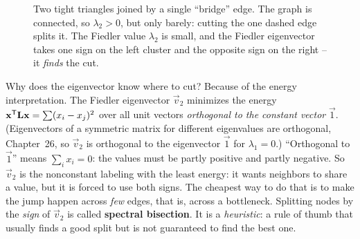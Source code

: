 \begin{figure}[H]
\centering
{}
\caption{Two tight triangles joined by a single ``bridge'' edge. The graph is connected, so
$\lambda_2 > 0$, but only barely: cutting the one dashed edge splits it. The Fiedler value
$\lambda_2$ is small, and the Fiedler eigenvector takes one sign on the left cluster and the
opposite sign on the right -- it \emph{finds} the cut.}
\label{ch35:fig-bridge}
\end{figure}

Why does the eigenvector know where to cut? Because of the energy interpretation. The
Fiedler eigenvector $\vec{v}_2$ minimizes the energy $\mathbf{x}^{\mathsf{T}}\mathbf{L}\mathbf{x} = \sum (x_i-x_j)^2$
over all unit vectors \emph{orthogonal to the constant vector} $\vec{1}$. (Eigenvectors of a
symmetric matrix for different eigenvalues are orthogonal, Chapter~26, so $\vec v_2$ is
orthogonal to the eigenvector $\vec 1$ for $\lambda_1 = 0$.) ``Orthogonal to $\vec{1}$''
means $\sum_i x_i = 0$: the values must be partly positive and partly negative. So $\vec{v}_2$
is the nonconstant labeling with the least energy: it wants neighbors to share a value, but
it is forced to use both signs. The cheapest way to do that is to make the jump happen across
\emph{few} edges, that is, across a bottleneck. Splitting nodes by the \emph{sign} of
$\vec{v}_2$ is called \textbf{spectral bisection}. It is a \emph{heuristic}: a rule of thumb
that usually finds a good split but is not guaranteed to find the best one.

